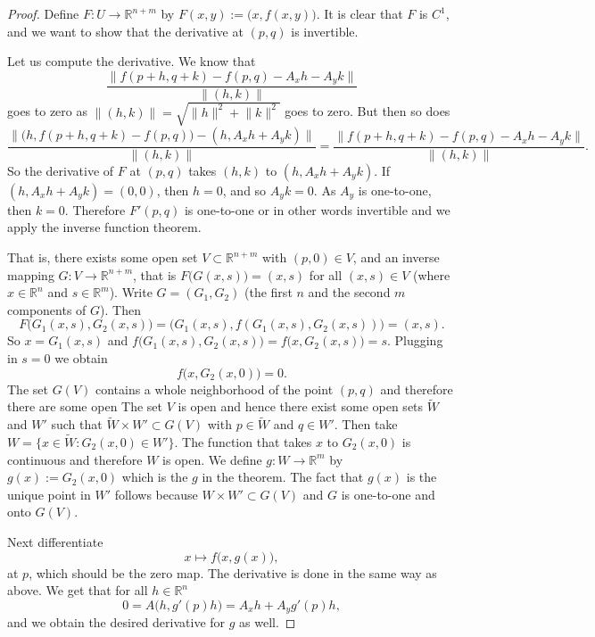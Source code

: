 \documentclass[12pt]{book}
\newcommand{\snorm}[1]{\lVert {#1} \rVert}
\newcommand{\R}{{\mathbb{R}}}
\theoremstyle{plain}
\theoremstyle{remark}
\theoremstyle{definition}
\theoremstyle{exercise}
\theoremstyle{example}
\begin{document}
\begin{proof}
Define $F \colon U \to \R^{n+m}$ by $F(x,y) := \bigl(x,f(x,y)\bigr)$.
It is clear that $F$ is $C^1$, and we want to show that the derivative
at $(p,q)$ is invertible.

Let us compute the derivative.  We know that
\begin{equation*}
\frac{\snorm{f(p+h,q+k) - f(p,q) - A_x h - A_y k}}{\snorm{(h,k)}}
\end{equation*}
goes to zero as $\snorm{(h,k)} = \sqrt{\snorm{h}^2+\snorm{k}^2}$ goes to zero.
But then so does
\begin{equation*}
\frac{\snorm{\bigl(h,f(p+h,q+k)-f(p,q)\bigr) - (h,A_x h+A_y
k)}}{\snorm{(h,k)}}
=
\frac{\snorm{f(p+h,q+k) - f(p,q) - A_x h - A_y k}}{\snorm{(h,k)}} .
\end{equation*}
So the derivative of $F$ at $(p,q)$ takes $(h,k)$ to $(h,A_x h+A_y k)$.  If 
$(h,A_x h+A_y k) = (0,0)$, then $h=0$, and so $A_y k = 0$.  As $A_y$ is
one-to-one, then $k=0$.  Therefore $F'(p,q)$ is one-to-one or in other
words invertible and we apply the inverse function theorem.

That is, there exists some open set $V \subset \R^{n+m}$ with $(p,0) \in V$, and an inverse
mapping $G \colon V \to \R^{n+m}$, that is $F\bigl(G(x,s)\bigr) = (x,s)$ for
all $(x,s) \in V$ (where
$x \in \R^n$ and $s \in \R^m$).
Write $G = (G_1,G_2)$ (the first $n$ and the second $m$ components of $G$).
Then
\begin{equation*}
F\bigl(G_1(x,s),G_2(x,s)\bigr) = \bigl(G_1(x,s),f(G_1(x,s),G_2(x,s))\bigr)
= (x,s) .
\end{equation*}
So $x = G_1(x,s)$ and $f\bigl(G_1(x,s),G_2(x,s)\bigr) = f\bigl(x,G_2(x,s)\bigr) = s$.
Plugging in $s=0$ we obtain
\begin{equation*}
f\bigl(x,G_2(x,0)\bigr) = 0 .
\end{equation*}
The set $G(V)$ contains a whole neighborhood of the point $(p,q)$
and therefore there are some open
The set $V$ is open and hence there exist some open sets
$\widetilde{W}$ and $W'$ such that $\widetilde{W} \times W' \subset G(V)$ with $p
\in \widetilde{W}$ and
$q \in W'$.
Then take $W = \{ x \in \widetilde{W} : G_2(x,0) \in W' \}$.
The function that takes $x$ to $G_2(x,0)$ is continuous and therefore $W$
is open.
We define
$g \colon W \to \R^m$ by $g(x) := G_2(x,0)$ which is the $g$ in the theorem.
The fact that $g(x)$ is the unique point in $W'$ follows because $W \times
W' \subset G(V)$ and $G$ is one-to-one and onto $G(V)$.

Next differentiate
\begin{equation*}
x\mapsto f\bigl(x,g(x)\bigr) ,
\end{equation*}
at $p$,
which should be the zero map.  The derivative is done in the same way as
above.  We get that for all $h \in \R^{n}$
\begin{equation*}
0 = A\bigl(h,g'(p)h\bigr) = A_xh + A_yg'(p)h ,
\end{equation*}
and we obtain the desired derivative for $g$ as well.
\end{proof}
\end{document}
